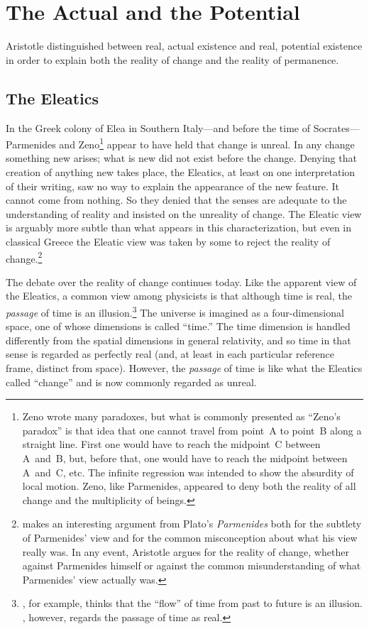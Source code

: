 \documentclass[twocolumn]{article}
\begin{document}
\section{The Actual and the Potential}

Aristotle distinguished between real, actual existence and real, potential
existence in order to explain both the reality of change and the reality of
permanence.

\subsection{The Eleatics}

In the Greek colony of Elea in Southern Italy---and before the time of
Socrates---Parmenides and Zeno\footnote{%
   Zeno wrote many paradoxes, but what is commonly presented as ``Zeno's
   paradox'' is that idea that one cannot travel from point~A to point~B along
   a straight line.  First one would have to reach the midpoint~C between
   A~and~B, but, before that, one would have to reach the midpoint between
   A~and~C, etc.  The infinite regression was intended to show the absurdity of
   local motion.  Zeno, like Parmenides, appeared to deny both the reality of
   all change and the multiplicity of beings.%
}
appear to have held that change is unreal.  In any change something new arises;
what is new did not exist before the change.  Denying that creation of anything
new takes place, the Eleatics, at least on one interpretation of their writing,
saw no way to explain the appearance of the new feature. It cannot come from
nothing.  So they denied that the senses are adequate to the understanding of
reality and insisted on the unreality of change.  The Eleatic view is arguably
more subtle than what appears in this characterization, but even in classical
Greece the Eleatic view was taken by some to reject the reality of
change.\footnote{%
   \cite{p2017} makes an interesting argument from Plato's {\it Parmenides}
   both for the subtlety of Parmenides' view and for the common misconception
   about what his view really was.  In any event, Aristotle argues for the
   reality of change, whether against Parmenides himself or against the common
   misunderstanding of what Parmenides' view actually was.%
}

The debate over the reality of change continues today.  Like the apparent view
of the Eleatics, a common view among physicists is that although time is real,
the \emph{passage} of time is an illusion.\footnote{%
   \cite{c2015}, for example, thinks that the ``flow'' of time from past to
   future is an illusion. \cite{s2013}, however, regards the passage of time as
   real.%
}
The universe is imagined as a four-dimensional space, one of whose dimensions
is called ``time.''  The time dimension is handled differently from the spatial
dimensions in general relativity, and so time in that sense is regarded as
perfectly real (and, at least in each particular reference frame, distinct from
space).  However, the \emph{passage} of time is like what the Eleatics called
``change'' and is now commonly regarded as unreal.
\end{document}
